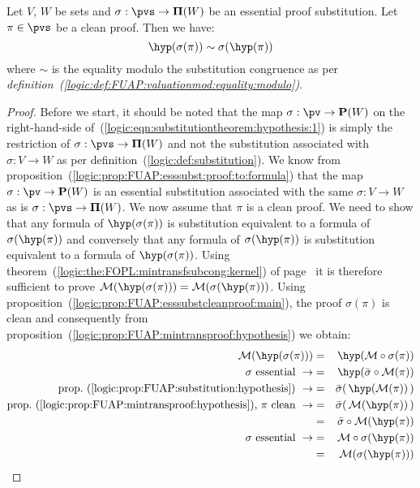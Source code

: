 \begin{prop}\label{logic:prop:substitutiontheorem:hypothesis}
Let $V$, $W$ be sets and $\sigma:\pvs\to{\bf\Pi}(W)$ be an essential
proof substitution. Let $\pi\in\pvs$ be a clean proof. Then we have:
    \begin{equation}\label{logic:eqn:substitutiontheorem:hypothesis:1}
    \hyp(\sigma(\pi))\sim\sigma(\hyp(\pi))
    \end{equation}
where $\sim$ is the equality modulo the substitution congruence as
per {\em
definition~(\ref{logic:def:FUAP:valuationmod:equality:modulo})}.
\end{prop}
\begin{proof}
Before we start, it should be noted that the map $\sigma:\pv\to{\bf
P}(W)$ on the right-hand-side
of~(\ref{logic:eqn:substitutiontheorem:hypothesis:1}) is simply the
restriction of $\sigma:\pvs\to{\bf\Pi}(W)$ and not the substitution
associated with $\sigma:V\to W$ as per
definition~(\ref{logic:def:substitution}). We know from
proposition~(\ref{logic:prop:FUAP:esssubst:proof:to:formula}) that
the map $\sigma:\pv\to{\bf P}(W)$ is an essential substitution
associated with the same $\sigma:V\to W$ as is
$\sigma:\pvs\to{\bf\Pi}(W)$. We now assume that $\pi$ is a clean
proof. We need to show that any formula of $\hyp(\sigma(\pi))$ is
substitution equivalent to a formula of $\sigma(\hyp(\pi))$ and
conversely that any formula of $\sigma(\hyp(\pi))$ is substitution
equivalent to a formula of $\hyp(\sigma(\pi))$. Using
theorem~(\ref{logic:the:FOPL:mintransfsubcong:kernel}) of
page~\pageref{logic:the:FOPL:mintransfsubcong:kernel} it is
therefore sufficient to prove ${\cal M}(\hyp(\sigma(\pi)))={\cal
M}(\sigma(\hyp(\pi)))$. Using
proposition~(\ref{logic:prop:FUAP:esssubstcleanproof:main}), the
proof $\sigma(\pi)$ is clean and consequently from
proposition~(\ref{logic:prop:FUAP:mintransproof:hypothesis}) we
obtain:
    \begin{eqnarray*}
    {\cal M}(\hyp(\sigma(\pi)))&=&\hyp({\cal M}\circ\sigma(\pi))\\
    \mbox{$\sigma$ essential}\ \rightarrow
    &=&\hyp(\bar{\sigma}\circ{\cal M}(\pi))\\
    \mbox{prop.~(\ref{logic:prop:FUAP:substitution:hypothesis})}\ \rightarrow
    &=&\bar{\sigma}(\,\hyp({\cal M}(\pi))\,)\\
    \mbox{prop.~(\ref{logic:prop:FUAP:mintransproof:hypothesis}), $\pi$ clean}\ \rightarrow
    &=&\bar{\sigma}(\,{\cal M}(\hyp(\pi))\,)\\
    &=&\bar{\sigma}\circ{\cal M}(\hyp(\pi))\\
    \mbox{$\sigma$ essential}\ \rightarrow
    &=&{\cal M}\circ\sigma(\hyp(\pi))\\
    &=&{\cal M}(\sigma(\hyp(\pi)))\\
    \end{eqnarray*}
\end{proof}
